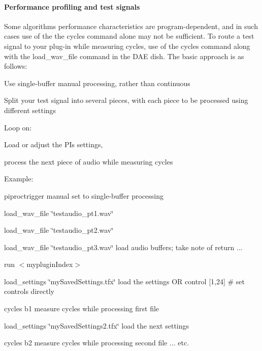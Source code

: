 \hypertarget{a00365_subsubsection__performance_profiling_and_test_signals_}{}\paragraph{Performance profiling and test signals}\label{a00365_subsubsection__performance_profiling_and_test_signals_}
 Some algorithms\textquotesingle{} performance characteristics are program-\/dependent, and in such cases use of the the cycles command alone may not be sufficient. To route a test signal to your plug-\/in while measuring cycles, use of the cycles command along with the {\ttfamily load\+\_\+wav\+\_\+file} command in the D\+A\+E dish. The basic approach is as follows\+: 
\begin{DoxyItemize}
\item Use single-\/buffer manual processing, rather than continuous  
\item Split your test signal into several pieces, with each piece to be processed using different settings  
\item Loop on\+: 
\begin{DoxyItemize}
\item Load or adjust the P\+I\textquotesingle{}s settings,  
\item process the next piece of audio while measuring cycles  
\end{DoxyItemize}
\end{DoxyItemize}

Example\+: 
\begin{DoxyEnumerate}
\item {\ttfamily piproctrigger manual}  set to single-\/buffer processing   
\item {\ttfamily load\+\_\+wav\+\_\+file \char`\"{}testaudio\+\_\+pt1.\+wav\char`\"{}}  
\item {\ttfamily load\+\_\+wav\+\_\+file \char`\"{}testaudio\+\_\+pt2.\+wav\char`\"{}}  
\item {\ttfamily load\+\_\+wav\+\_\+file \char`\"{}testaudio\+\_\+pt3.\+wav\char`\"{}}  load audio buffers; take note of return ...  
\item {\ttfamily run $<$myplugin\+Index$>$} 
\item {\ttfamily load\+\_\+settings \char`\"{}my\+Saved\+Settings.\+tfx\char`\"{} }  load the settings  O\+R  {\ttfamily control \mbox{[}1,24\mbox{]} }\# set controls directly   
\item {\ttfamily cycles b1}  measure cycles while processing first file  
\item {\ttfamily load\+\_\+settings \char`\"{}my\+Saved\+Settings2.\+tfx\char`\"{}}  load the next settings  
\item {\ttfamily cycles b2}  measure cycles while processing second file  ... etc.   
\end{DoxyEnumerate}

